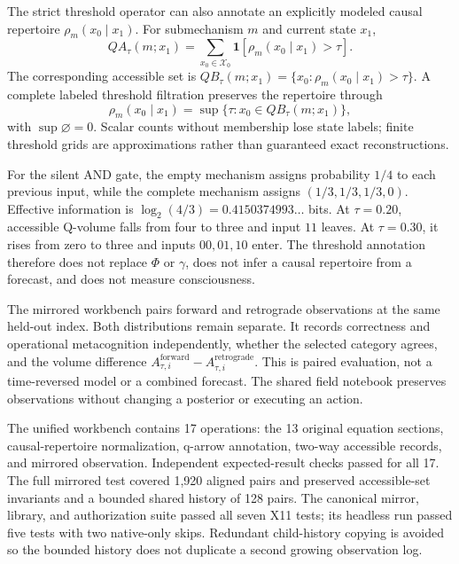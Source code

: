 \documentclass[11pt,a4paper]{article}
\begin{document}
The strict threshold operator can also annotate an explicitly modeled causal repertoire $\rho_m(x_0\mid x_1)$. For submechanism $m$ and current state $x_1$,
\begin{equation}
QA_\tau(m;x_1)=\sum_{x_0\in\mathcal X_0}\mathbf 1[\rho_m(x_0\mid x_1)>\tau].
\end{equation}
The corresponding accessible set is $QB_\tau(m;x_1)=\{x_0:\rho_m(x_0\mid x_1)>\tau\}$. A complete labeled threshold filtration preserves the repertoire through
\begin{equation}
\rho_m(x_0\mid x_1)=\sup\{\tau:x_0\in QB_\tau(m;x_1)\},
\end{equation}
with $\sup\varnothing=0$. Scalar counts without membership lose state labels; finite threshold grids are approximations rather than guaranteed exact reconstructions.

For the silent AND gate, the empty mechanism assigns probability $1/4$ to each previous input, while the complete mechanism assigns $(1/3,1/3,1/3,0)$. Effective information is $\log_2(4/3)=0.4150374993\ldots$ bits. At $\tau=0.20$, accessible Q-volume falls from four to three and input $11$ leaves. At $\tau=0.30$, it rises from zero to three and inputs $00,01,10$ enter. The threshold annotation therefore does not replace $\Phi$ or $\gamma$, does not infer a causal repertoire from a forecast, and does not measure consciousness.

The mirrored workbench pairs forward and retrograde observations at the same held-out index. Both distributions remain separate. It records correctness and operational metacognition independently, whether the selected category agrees, and the volume difference $A_{\tau,i}^{\mathrm{forward}}-A_{\tau,i}^{\mathrm{retrograde}}$. This is paired evaluation, not a time-reversed model or a combined forecast. The shared field notebook preserves observations without changing a posterior or executing an action.

The unified workbench contains 17 operations: the 13 original equation sections, causal-repertoire normalization, q-arrow annotation, two-way accessible records, and mirrored observation. Independent expected-result checks passed for all 17. The full mirrored test covered 1,920 aligned pairs and preserved accessible-set invariants and a bounded shared history of 128 pairs. The canonical mirror, library, and authorization suite passed all seven X11 tests; its headless run passed five tests with two native-only skips. Redundant child-history copying is avoided so the bounded history does not duplicate a second growing observation log.
\end{document}
